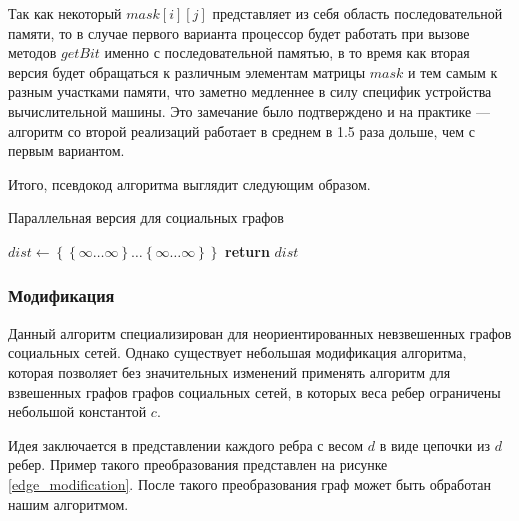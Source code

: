 Так как некоторый $mask[i][j]$ представляет из себя область последовательной памяти, то в случае первого варианта процессор будет работать при вызове методов $getBit$ именно с последовательной памятью, в то время как вторая версия будет обращаться к различным элементам матрицы $mask$ и тем самым к разным участками памяти, что заметно медленнее в силу специфик устройства вычислительной машины. Это замечание было подтверждено и на практике --- алгоритм со второй реализаций работает в среднем в 1.5 раза дольше, чем с первым вариантом.

Итого, псевдокод алгоритма выглядит следующим образом.

\FloatBarrier
\begin{algorithm}
\caption{Параллельная версия для социальных графов}\label{all_pairs_social}
\begin{algorithmic}[1]

\State $dist\gets \left\{ {   \left\{ {\infty \ldots \infty}\right\}  \ldots \left\{ {\infty \ldots \infty}\right\} }\right\}$
 
\State \textbf{return} $dist$ 
\EndProcedure

\end{algorithmic}
\end{algorithm}



\FloatBarrier
\subsubsection{Модификация}

Данный алгоритм специализирован для неориентированных невзвешенных графов социальных сетей. Однако существует небольшая модификация алгоритма, которая позволяет без значительных изменений применять алгоритм для взвешенных графов графов социальных сетей, в которых веса ребер ограничены небольшой константой $c$. 

Идея заключается в представлении каждого ребра с весом $d$ в виде цепочки из $d$ ребер. Пример такого преобразования представлен на рисунке \ref{edge_modification}. После такого преобразования граф может быть обработан нашим алгоритмом.

